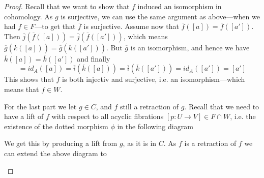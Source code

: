 \begin{proof}
Recall that we want to show that $f$ induced an isomorphism in cohomology. As $g$ is surjective, we can use the same argument as above---when we had $f\in F$---to get that $\overline{f}$ is surjective. Assume now that $\overline{f}([a]) = \overline{f}([a'])$. Then $\overline{j}(\overline{f}([a])) = \overline{j}(\overline{f}([a']))$, which means $\overline{g}(\overline{k}([a])) = \overline{g}(\overline{k}([a']))$. But $\overline{g}$ is an isomorphism, and hence we have $\overline{k}([a]) = \overline{k}([a'])$ and finally
\begin{equation*}
    [a] = id_A([a]) = \overline{i}(\overline{k}([a])) = \overline{i}(\overline{k}([a'])) = id_A([a']) = [a']
\end{equation*}
This shows that $\overline{f}$ is both injectiv and surjective, i.e. an isomorphism---which means that $f\in W$. 

For the last part we let $g\in C$, and $f$ still a retraction of $g$. Recall that we need to have a lift of $f$ with respect to all acyclic fibrations $[p\colon U\longrightarrow V]\in F\cap W$, i.e. the existence of the dotted morphism $\phi$ in the following diagram
\begin{center}
\end{center}

We get this by producing a lift from $g$, as it is in $C$. As $f$ is a retraction of $f$ we can extend the above diagram to 
\begin{center}
\end{center}


\end{proof}

